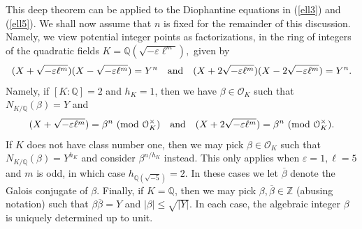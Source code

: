 \documentclass[12pt]{amsart}
\newcommand{\Z}{\mathbb{Z}}
\newcommand{\Q}{\mathbb{Q}}
\newcommand{\?}{\color{red}?}
\numberwithin{equation}{section}
\begin{document}
This deep theorem can be applied to the  Diophantine equations in (\ref{ell3}) and (\ref{ell5}).
We shall now assume that $n$ is fixed for the remainder of this discussion.
Namely, we view potential integer points as factorizations, in the ring of integers
of  the quadratic fields $K=\Q(\sqrt{-\varepsilon \ell^m}),$
given by
\begin{align*}
(X+\sqrt{-\varepsilon \ell^m})(X-\sqrt{-\varepsilon \ell^m}) =Y^n \ \  \ {\text {\rm and}}\ \  \
(X+2\sqrt{-\varepsilon \ell^m})(X-2\sqrt{-\varepsilon \ell^m}) =Y^n.
\end{align*}
Namely, if $[K:\Q]=2$ and $h_K=1$, then we have $\beta\in\mathcal{O}_K$ such that $N_{K/\mathbb{Q}}(\beta)=Y$ and 
\begin{align*}
    (X+\sqrt{-\varepsilon \ell^m})=\beta^n ~(\mathrm{mod}~ \mathcal{O}_{K}^{\times})
    \ \ \ {\text {\rm and}}\ \ \ 
    (X+2\sqrt{-\varepsilon \ell^m})=\beta^n ~(\mathrm{mod}~ \mathcal{O}_{K}^{\times}).
\end{align*}
If $K$ does not have class number one, then we may pick $\beta\in\mathcal{O}_K$ such that $  N_{K/\mathbb{Q}}(\beta)=Y^{h_K}$ and consider $\beta^{{n}/{h_K}}$ instead.
This only applies when $\varepsilon=1, \ell=5$ and $m$ is odd, in which case  $h_{\Q(\sqrt{-5})}=2$. 
In these cases we let $\overline{\beta}$ denote the Galois conjugate of $\beta$. Finally, if $K=\Q$, then we may pick $\beta,\overline{\beta}\in\Z$  (abusing notation) such that $\beta\overline{\beta}=Y$ and $|{\beta}|\leq \sqrt{|Y|}.$
In each case, the algebraic integer $\beta$ is uniquely determined up to unit.
\end{document}

